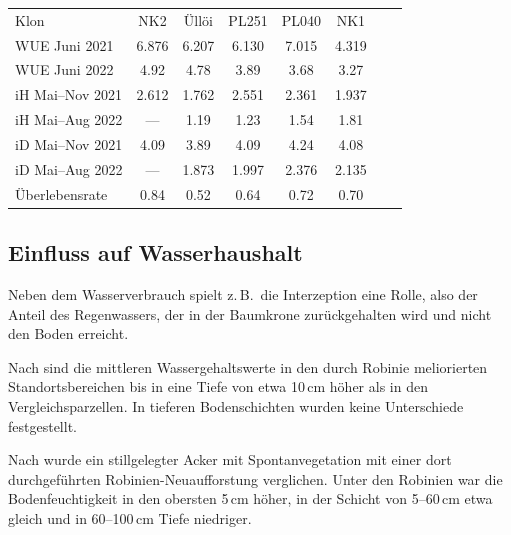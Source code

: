 \documentclass[twocolumn]{scrartcl}
\begin{document}
\begin{table}[htbp]
  \centering
  \begin{tabular}{l *{7}{S[table-format=1.3]}}
    Klon    &  {NK2} & {Üllöi} & {PL251} & {PL040} & {NK1} \\[.3em]
    WUE Juni 2021 & 6.876 & 6.207 & 6.130 & 7.015 & 4.319 \\
    WUE Juni 2022 &  4.92 & 4.78 & 3.89 & 3.68 & 3.27 \\[.3em]
    iH Mai--Nov 2021 & 2.612 & 1.762 & 2.551 & 2.361 & 1.937 \\
    iH Mai--Aug 2022 & {---} & 1.19 & 1.23 & 1.54 & 1.81 \\[.3em]
    iD Mai--Nov 2021 & 4.09 & 3.89 & 4.09 & 4.24 & 4.08 \\
    iD Mai--Aug 2022 & {---} & 1.873 & 1.997 & 2.376 & 2.135\\[.3em]
    Überlebensrate & 0.84 & 0.52 & 0.64 & 0.72 & 0.70
  \end{tabular}
  \label{tab:WUErobinie}
\end{table}

\subsection{Einfluss auf Wasserhaushalt}

Neben dem Wasserverbrauch spielt z.\,B.\ die Interzeption eine Rolle, also der Anteil des Regenwassers, der in der Baumkrone zurückgehalten wird und nicht den Boden erreicht.

Nach \citet{gemeinhardt1959robinie} sind die mittleren Wassergehaltswerte in den durch Robinie meliorierten Standortsbereichen bis in eine Tiefe von etwa 10\,cm höher als in den Vergleichsparzellen. In tieferen Bodenschichten wurden keine Unterschiede festgestellt.

Nach \citet{kou2016robinieBoden} wurde ein stillgelegter Acker mit Spontanvegetation mit einer dort durchgeführten Robinien-Neuaufforstung verglichen. Unter den Robinien war die Bodenfeuchtigkeit in den obersten 5\,cm höher, in der Schicht von 5--60\,cm etwa gleich und in 60--100\,cm Tiefe niedriger.
\end{document}
